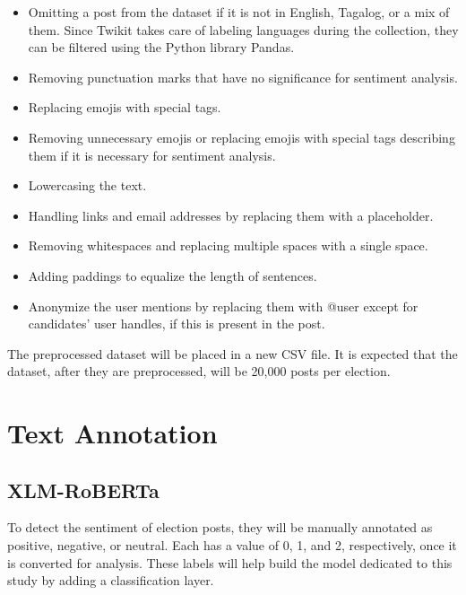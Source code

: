 \begin{itemize}
    \item Omitting a post from the dataset if it is not in English, Tagalog, or a mix of them. Since Twikit takes care of labeling languages during the collection, they can be filtered using the Python library Pandas.
    \item Removing punctuation marks that have no significance for sentiment analysis.
    \item Replacing emojis with special tags.
    \item Removing unnecessary emojis or replacing emojis with special tags describing them if it is necessary for sentiment analysis.
    \item Lowercasing the text.
    \item Handling links and email addresses by replacing them with a placeholder.
    \item Removing whitespaces and replacing multiple spaces with a single space.
    \item Adding paddings to equalize the length of sentences.
    \item Anonymize the user mentions by replacing them with @user except for candidates’ user handles, if this is present in the post.
\end{itemize}

The preprocessed dataset will be placed in a new CSV file. It is expected that the dataset, after they are preprocessed, will be 20,000 posts per election.

\section{Text Annotation}
\subsection{XLM-RoBERTa}
To detect the sentiment of election posts, they will be manually annotated as positive, negative, or neutral. Each has a value of 0, 1, and 2, respectively, once it is converted for analysis. These labels will help build the model dedicated to this study by adding a classification layer.


